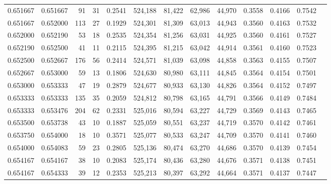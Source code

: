 \begin{tabular}{rrrrrrrrrrrrr}
0.651667 & 0.651667 &    91 &  31 &                                     0.2541 & 524,188 &  81,422 &  62,986 &  44,970 & 0.3558 & 0.4166 & 0.7542 \\
0.651667 & 0.652000 &   113 &  27 &                                     0.1929 & 524,301 &  81,309 &  63,013 &  44,943 & 0.3560 & 0.4163 & 0.7532 \\
0.652000 & 0.652190 &    53 &  18 &                                     0.2535 & 524,354 &  81,256 &  63,031 &  44,925 & 0.3560 & 0.4161 & 0.7527 \\
0.652190 & 0.652500 &    41 &  11 &                                     0.2115 & 524,395 &  81,215 &  63,042 &  44,914 & 0.3561 & 0.4160 & 0.7523 \\
0.652500 & 0.652667 &   176 &  56 &                                     0.2414 & 524,571 &  81,039 &  63,098 &  44,858 & 0.3563 & 0.4155 & 0.7507 \\
0.652667 & 0.653000 &    59 &  13 &                                     0.1806 & 524,630 &  80,980 &  63,111 &  44,845 & 0.3564 & 0.4154 & 0.7501 \\
0.653000 & 0.653333 &    47 &  19 &                                     0.2879 & 524,677 &  80,933 &  63,130 &  44,826 & 0.3564 & 0.4152 & 0.7497 \\
0.653333 & 0.653333 &   135 &  35 &                                     0.2059 & 524,812 &  80,798 &  63,165 &  44,791 & 0.3566 & 0.4149 & 0.7484 \\
0.653333 & 0.653476 &   204 &  62 &                                     0.2331 & 525,016 &  80,594 &  63,227 &  44,729 & 0.3569 & 0.4143 & 0.7465 \\
0.653500 & 0.653738 &    43 &  10 &                                     0.1887 & 525,059 &  80,551 &  63,237 &  44,719 & 0.3570 & 0.4142 & 0.7461 \\
0.653750 & 0.654000 &    18 &  10 &                                     0.3571 & 525,077 &  80,533 &  63,247 &  44,709 & 0.3570 & 0.4141 & 0.7460 \\
0.654000 & 0.654083 &    59 &  23 &                                     0.2805 & 525,136 &  80,474 &  63,270 &  44,686 & 0.3570 & 0.4139 & 0.7454 \\
0.654167 & 0.654167 &    38 &  10 &                                     0.2083 & 525,174 &  80,436 &  63,280 &  44,676 & 0.3571 & 0.4138 & 0.7451 \\
0.654167 & 0.654333 &    39 &  12 &                                     0.2353 & 525,213 &  80,397 &  63,292 &  44,664 & 0.3571 & 0.4137 & 0.7447 \\

\end{tabular}
